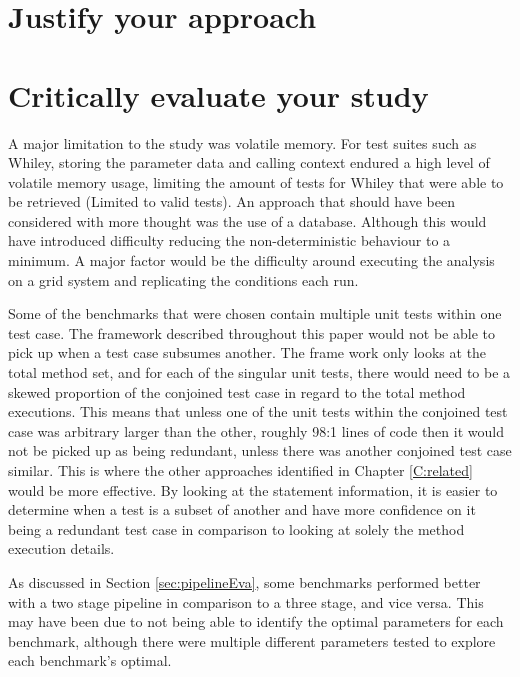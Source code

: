 
\section{Justify your approach}



\section{Critically evaluate your study}
\label{sec:crit}
A major limitation to the study was volatile memory. For test suites such as Whiley, storing the parameter data and calling context endured a high level of volatile memory usage, limiting the amount of tests for Whiley that were able to be retrieved (Limited to valid tests). An approach that should have been considered with more thought was the use of a database. Although this would have introduced difficulty reducing the non-deterministic behaviour to a minimum. A major factor would be the difficulty around executing the analysis on a grid system and replicating the conditions each run.

Some of the benchmarks that were chosen contain multiple unit tests within one test case. The framework described throughout this paper would not be able to pick up when a test case subsumes another. The frame work only looks at the total method set, and for each of the singular unit tests, there would need to be a skewed proportion of the conjoined test case in regard to the total method executions. This means that unless one of the unit tests within the conjoined test case was arbitrary larger than the other, roughly 98:1 lines of code then it would not be picked up as being redundant, unless there was another conjoined test case similar. This is where the other approaches identified in Chapter \ref{C:related} would be more effective. By looking at the statement information, it is easier to determine when a test is a subset of another and have more confidence on it being a redundant test case in comparison to looking at solely the method execution details. 

As discussed in Section \ref{sec:pipelineEva}, some benchmarks performed better with a two stage pipeline in comparison to a three stage, and vice versa. This may have been due to not being able to identify the optimal parameters for each benchmark, although there were multiple different parameters tested to explore each benchmark's optimal. 